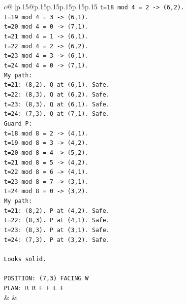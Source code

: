 \documentclass{article}
\begin{document}
{\begin{supertabular}{c@{$\;$}|p{.15\linewidth}@{}p{.15\linewidth}p{.15\linewidth}p{.15\linewidth}p{.15\linewidth}p{.15\linewidth}}
{{{\texttt{t=18 mod 4 = 2 {-}> (6,2).} \\
\texttt{t=19 mod 4 = 3 {-}> (6,1).} \\
\texttt{t=20 mod 4 = 0 {-}> (7,1).} \\
\texttt{t=21 mod 4 = 1 {-}> (6,1).} \\
\texttt{t=22 mod 4 = 2 {-}> (6,2).} \\
\texttt{t=23 mod 4 = 3 {-}> (6,1).} \\
\texttt{t=24 mod 4 = 0 {-}> (7,1).} \\
\texttt{My path:} \\
\texttt{t=21: (8,2). Q at (6,1). Safe.} \\
\texttt{t=22: (8,3). Q at (6,2). Safe.} \\
\texttt{t=23: (8,3). Q at (6,1). Safe.} \\
\texttt{t=24: (7,3). Q at (7,1). Safe.} \\
\texttt{Guard P:} \\
\texttt{t=18 mod 8 = 2 {-}> (4,1).} \\
\texttt{t=19 mod 8 = 3 {-}> (4,2).} \\
\texttt{t=20 mod 8 = 4 {-}> (5,2).} \\
\texttt{t=21 mod 8 = 5 {-}> (4,2).} \\
\texttt{t=22 mod 8 = 6 {-}> (4,1).} \\
\texttt{t=23 mod 8 = 7 {-}> (3,1).} \\
\texttt{t=24 mod 8 = 0 {-}> (3,2).} \\
\texttt{My path:} \\
\texttt{t=21: (8,2). P at (4,2). Safe.} \\
\texttt{t=22: (8,3). P at (4,1). Safe.} \\
\texttt{t=23: (8,3). P at (3,1). Safe.} \\
\texttt{t=24: (7,3). P at (3,2). Safe.} \\
\\ 
\texttt{Looks solid.} \\
\\ 
\texttt{POSITION: (7,3) FACING W} \\
\texttt{PLAN: R R F F L F} \\
            }
        }
    }
    & & \\ \\


\end{supertabular}}
\end{document}
